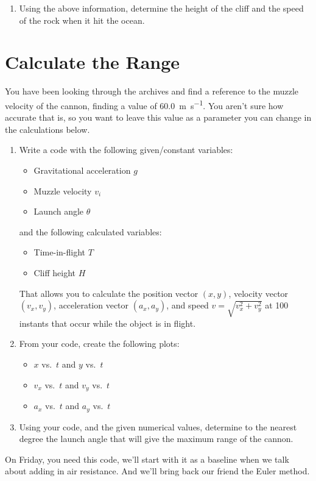 \documentclass{article}   	%
\begin{document}
\begin{enumerate}[resume]
  \item Using the above information, determine the height of the cliff and the speed of the
  rock when it hit the ocean. \vspace{0.5in}
\end{enumerate}

\section{Calculate the Range}
\begin{tcolorbox}[colback=black!5!white,colframe=white!15!black,title=More information]
  You have been looking through the archives and find a reference to the muzzle velocity of the
  cannon, finding a value of \SI{60.0}{\meter\per\second}. You aren't sure how accurate that
  is, so you want to leave this value as a parameter you can change in the calculations below.
\end{tcolorbox}

\begin{enumerate}
  \item Write a code with the following given/constant variables:
  \begin{itemize}
    \item Gravitational acceleration $g$
    \item Muzzle velocity $v_i$
    \item Launch angle $\theta$
  \end{itemize}
  and the following calculated variables:
  \begin{itemize}
    \item Time-in-flight $T$
    \item Cliff height $H$
  \end{itemize}
  That allows you to calculate the position vector $(x,y)$, velocity vector $(v_x,v_y)$,
  acceleration vector $(a_x, a_y)$, and speed $v=\sqrt{v_x^2 + v_y^2}$ at 100 instants that
  occur while the object is in flight.
  \item From your code, create the following plots:
  \begin{itemize}
    \item $x$ vs.\ $t$ and $y$ vs.\ $t$
    \item $v_x$ vs.\ $t$ and $v_y$ vs.\ $t$
    \item $a_x$ vs.\ $t$ and $a_y$ vs.\ $t$
  \end{itemize}
  \item Using your code, and the given numerical values, determine to the nearest degree the
  launch angle that will give the maximum range of the cannon.
\end{enumerate}

On Friday, you need this code, we'll start with it as a baseline when we talk about adding in
air resistance. And we'll bring back our friend the Euler method.
\end{document}
